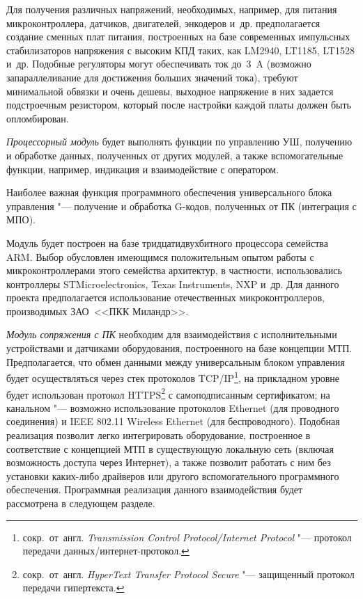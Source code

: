 Для получения различных напряжений, необходимых, например, для питания микроконтроллера, датчиков, двигателей, энкодеров и~др. предполагается создание сменных плат питания, построенных на базе современных импульсных стабилизаторов напряжения с высоким КПД таких, как \foreignlanguage{english}{LM}2940, \foreignlanguage{english}{LT}1185, \foreignlanguage{english}{LT}1528 и~др. Подобные регуляторы могут обеспечивать ток до~\SI{3}{\ampere} (возможно запараллеливание для достижения больших значений тока), требуют минимальной обвязки и очень дешевы, выходное напряжение в них задается подстроечным резистором, который после настройки каждой платы должен быть опломбирован.

\textit{Процессорный модуль} будет выполнять функции по управлению УШ, получению и обработке данных, полученных от других модулей, а также вспомогательные функции, например, индикация и взаимодействие с оператором.

Наиболее важная функция программного обеспечения универсального блока управления "--- получение и обработка \foreignlanguage{english}{G}-кодов, полученных от ПК (интеграция с \foreignlanguage{english}{МПО}).

Модуль будет построен на базе тридцатидвухбитного процессора семейства \foreignlanguage{english}{ARM}. Выбор обусловлен имеющимся положительным опытом работы с микроконтроллерами этого семейства архитектур, в частности, использовались контроллеры \foreignlanguage{english}{STMicroelectronics}, \foreignlanguage{english}{Texas Instruments}, \foreignlanguage{english}{NXP} и~др. Для данного проекта предполагается использование отечественных микроконтроллеров, производимых ЗАО~<<ПКК Миландр>>.

\textit{Модуль сопряжения с ПК} необходим для взаимодействия с исполнительными устройствами и датчиками оборудования, построенного на базе концепции \foreignlanguage{english}{МТП}. Предполагается, что обмен данными между универсальным блоком управления будет осуществляться через стек протоколов \foreignlanguage{english}{TCP/IP}\footnote{сокр.~от~англ. \textit{Transmission Control Protocol/Internet Protocol} "--- протокол передачи данных/интернет-протокол.}, на прикладном уровне будет использован протокол \foreignlanguage{english}{HTTPS}\footnote{сокр.~от~англ. \textit{HyperText Transfer Protocol Secure} "--- защищенный протокол передачи гипертекста.} с самоподписанным сертификатом; на канальном "--- возможно использование протоколов \foreignlanguage{english}{Ethernet} (для проводного соединения) и IEEE 802.11 Wireless Ethernet (для беспроводного). Подобная реализация позволит легко интегрировать оборудование, построенное в соответствие с концепцией \foreignlanguage{english}{МТП} в существующую локальную сеть (включая возможность доступа через Интернет), а также позволит работать с ним без установки каких-либо драйверов или другого вспомогательного программного обеспечения. Программная реализация данного взаимодействия будет рассмотрена в следующем разделе.

